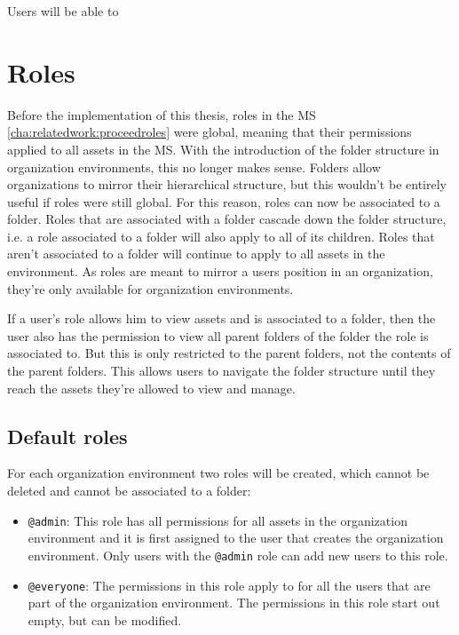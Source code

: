 Users will be able to 

\section{Roles}

Before the implementation of this thesis, roles in the MS
\ref{cha:relatedwork:proceedroles} were global,
meaning that their permissions applied to all assets in the MS.
With the introduction of the folder structure in organization environments, this no longer makes sense.
Folders allow organizations to mirror their hierarchical structure, but this wouldn't be
entirely useful if roles were still global.
For this reason, roles can now be associated to a folder.
Roles that are associated with a folder cascade down the
folder structure, i.e. a role associated to a folder will also apply to all of its children.
Roles that aren't associated to a folder will continue to apply to all assets in the environment.
As roles are meant to mirror a users position in an organization, they're only available
for organization environments.


If a user's role allows him to view assets and is associated to a folder, then the user
also has the permission to view all parent folders of the folder the role is associated to.
But this is only restricted to the parent folders, not the contents of the parent folders.
This allows users to navigate the folder structure until they reach the assets they're
allowed to view and manage.


\subsection{Default roles}

For each organization environment two roles will be created, which cannot be deleted and
cannot be associated to a folder:

\begin{itemize}
  \item \lstinline{@admin}: This role has all permissions for all assets in the
    organization environment and it is first assigned to the user that creates the organization environment.
    Only users with the \lstinline{@admin} role can add new users to this role.
  \item \lstinline{@everyone}: The permissions in this role apply to for all the users
    that are part of the organization environment. The permissions in this role start out
    empty, but can be modified.
\end{itemize}

